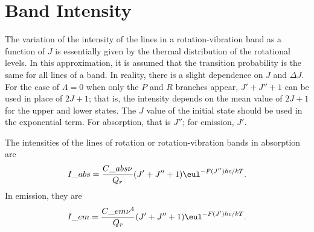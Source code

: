 \section{Band Intensity}
\label{s:band_intensity}

The variation of the intensity of the lines in a rotation-vibration band as a function of $J$ is essentially given by the thermal distribution of the rotational levels. In this approximation, it is assumed that the transition probability is the same for all lines of a band. In reality, there is a slight dependence on $J$ and $\Delta{}J$. For the case of $\Lambda = 0$ when only the $P$ and $R$ branches appear, $J' + J'' + 1$ can be used in place of $2J + 1$; that is, the intensity depends on the mean value of $2J + 1$ for the upper and lower states. The $J$ value of the initial state should be used in the exponential term. For absorption, that is $J''$; for emission, $J'$.

The intensities of the lines of rotation or rotation-vibration bands in absorption are
\begin{equation}
    I\_{abs} = \frac{C\_{abs}\nu}{Q_r}(J' + J'' + 1)\eul^{-F(J'')hc/kT}.
\end{equation}
In emission, they are
\begin{equation}
    I\_{em} = \frac{C\_{em}\nu^4}{Q_r}(J' + J'' + 1)\eul^{-F(J')hc/kT}.
\end{equation}
